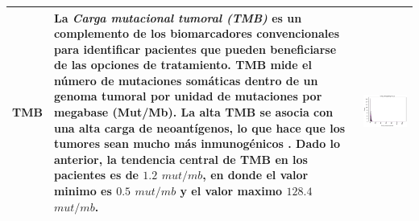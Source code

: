 \begin{table}[!htb]
	\footnotesize
	\begin{threeparttable}
		\begin{tabular}{p{2.5cm} p{7cm} p{6.5cm}} \toprule	
					
		TMB
		& La \textit{Carga mutacional tumoral (TMB)} es un complemento de los biomarcadores convencionales para identificar pacientes que pueden beneficiarse de las opciones de tratamiento. TMB mide el número de mutaciones somáticas dentro de un genoma tumoral por unidad de mutaciones por megabase (Mut/Mb). La alta TMB se asocia con una alta carga de neoantígenos, lo que hace que los tumores sean mucho más inmunogénicos \cite{Ke2022}. Dado lo anterior, la tendencia central de TMB en los pacientes es de $1.2$ $mut/mb$, en donde el valor minimo es $0.5$ $mut/mb$ y el valor maximo $128.4$ $mut/mb$.
		
		& \begin{center}\includegraphics[width=1\linewidth]{NOTEBOOK/IMAGENES_DESCRIPTIVAS/42_tmb_nonsynonymous}\end{center}
		\\ \hline
		

\end{tabular}
\end{threeparttable}
\end{table}
